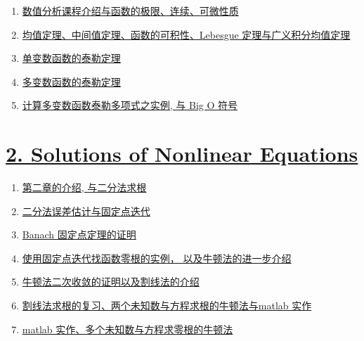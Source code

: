 \documentclass[11pt]{article}
\begin{document}
\vspace{-0.5cm}

\begin{enumerate}
	\item \href{https://mp.weixin.qq.com/s/txFQz9Uv6sSRECOa8RAvng}{数值分析课程介绍与函数的极限、连续、可微性质} %
	\item \href{https://mp.weixin.qq.com/s/BuHnLOTA9n4k2t0ojFIJzw}{均值定理、中间值定理、函数的可积性、Lebesgue 定理与广义积分均值定理} %
	\item \href{https://mp.weixin.qq.com/s/V7arbQphHjXyKOA3TIzmTw}{单变数函数的泰勒定理} %
	\item \href{https://mp.weixin.qq.com/s/El2mhfgln6Bm6YEAlTzQHA}{多变数函数的泰勒定理} %
	\item \href{https://mp.weixin.qq.com/s/uBixHedRMFbjLdzP9Uqvgg}{计算多变数函数泰勒多项式之实例, 与 Big O 符号} %
\end{enumerate}

\vspace{-1cm}

\section*{\href{titlehttps://www.youtube.com/playlist?list=PLGwoNNTgFGegki7UM7c-jKpvbisfBmRGn}{2. Solutions of Nonlinear Equations}} %

\vspace{-0.5cm}

\begin{enumerate}
	\item \href{https://mp.weixin.qq.com/s/6xS0HIZ5yhT6GkG2ZkonPg}{第二章的介绍, 与二分法求根} %
	\item \href{https://mp.weixin.qq.com/s/WP8zPNNjeCUD3U4TxZzjSQ}{二分法误差估计与固定点迭代} %
	\item \href{https://mp.weixin.qq.com/s/8wV18NXy7BJWM2IcTOfspA}{Banach 固定点定理的证明} %
	\item \href{https://mp.weixin.qq.com/s/6TkANAVqRoM2SJOEXEhPPg}{使用固定点迭代找函数零根的实例， 以及牛顿法的进一步介绍} %
	\item \href{https://mp.weixin.qq.com/s/A8n6ndiE4Ak4f_CaBDWWnA}{牛顿法二次收敛的证明以及割线法的介绍} %
	\item \href{https://mp.weixin.qq.com/s/TSTofV8kOoEPSLO0GD_zLw}{割线法求根的复习、两个未知数与方程求根的牛顿法与matlab 实作} %
	\item \href{https://mp.weixin.qq.com/s/o9Za8whZfVxK2256tnOMUA}{matlab 实作、多个未知数与方程求零根的牛顿法} %
\end{enumerate}
\end{document}

